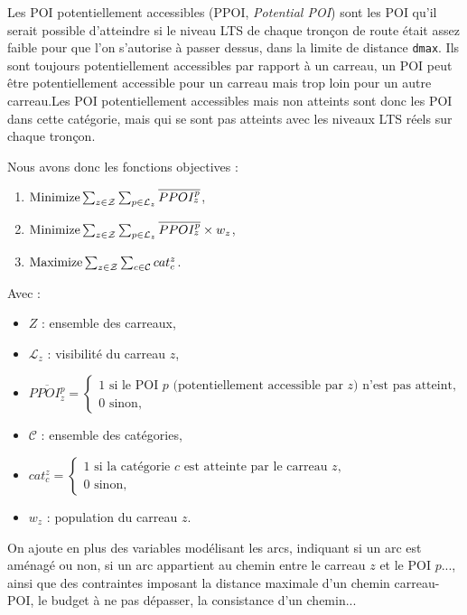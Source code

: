 Les POI potentiellement accessibles (PPOI, \emph{Potential POI}) sont les POI qu'il serait possible d'atteindre si le niveau LTS de chaque tronçon de route était assez faible pour que l'on s'autorise à passer dessus, dans la limite de distance \texttt{dmax}. Ils sont toujours potentiellement accessibles par rapport à un carreau, un POI peut être potentiellement accessible pour un carreau mais trop loin pour un autre carreau.Les POI potentiellement accessibles mais non atteints sont donc les POI dans cette catégorie, mais qui se sont pas atteints avec les niveaux LTS réels sur chaque tronçon. 

Nous avons donc les fonctions objectives :

\begin{enumerate} \label{enum:function_obj}
    \item $\operatorname{Minimize} \sum_{z \in \mathcal{Z} } \sum_{p \in \mathcal{L}_z} \overline{PPOI_z^p}$,
    \item $\operatorname{Minimize} \sum_{z \in \mathcal{Z} } \sum_{p \in \mathcal{L}_z} \overline{PPOI_z^p} \times w_z$,
    \item $\operatorname{Maximize} \sum_{z \in \mathcal{Z} } \sum_{c \in \mathcal{C}} cat_c^z$.
\end{enumerate}

Avec :

\begin{itemize}
    \item $Z$ : ensemble des carreaux,
    \item $\mathcal{L}_z$ : visibilité du carreau $z$,
    \item $\overline{PPOI_z^p}=
    \begin{cases}
        1 \text{ si le POI $p$ (potentiellement accessible par $z$) n'est pas atteint,} \\
        0 \text{ sinon,}
    \end{cases}$
    \item $\mathcal{C}$ : ensemble des catégories,
    \item $cat_c^z=
    \begin{cases}
        1 \text{ si la catégorie $c$ est atteinte par le carreau $z$,} \\
        0 \text{ sinon,}
    \end{cases}$
    \item $w_z$ : population du carreau $z$.
\end{itemize}

On ajoute en plus des variables modélisant les arcs, indiquant si un arc est aménagé ou non, si un arc appartient au chemin entre le carreau $z$ et le POI $p$..., ainsi que des contraintes imposant la distance maximale d'un chemin carreau-POI, le budget à ne pas dépasser, la consistance d'un chemin...


